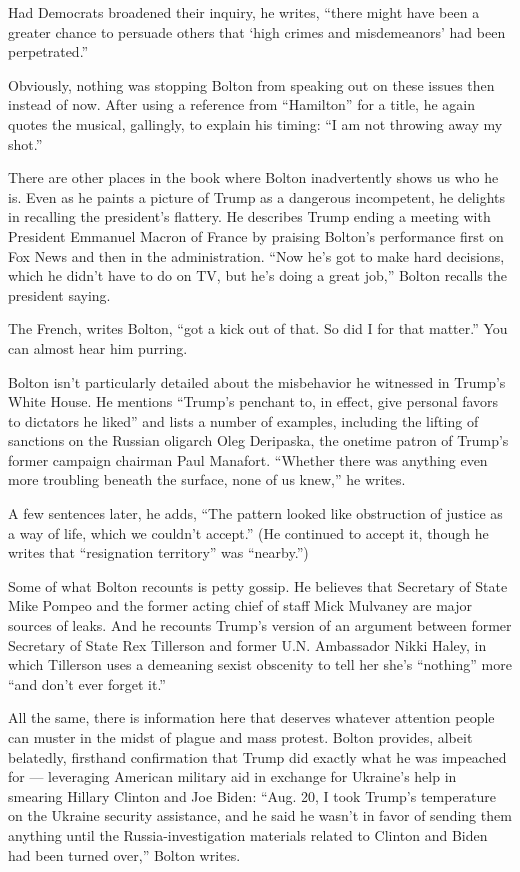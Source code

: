 Had Democrats broadened their inquiry, he writes, ``there might have
been a greater chance to persuade others that `high crimes and
misdemeanors' had been perpetrated.''

Obviously, nothing was stopping Bolton from speaking out on these issues
then instead of now. After using a reference from ``Hamilton'' for a
title, he again quotes the musical, gallingly, to explain his timing:
``I am not throwing away my shot.''

There are other places in the book where Bolton inadvertently shows us
who he is. Even as he paints a picture of Trump as a dangerous
incompetent, he delights in recalling the president's flattery. He
describes Trump ending a meeting with President Emmanuel Macron of
France by praising Bolton's performance first on Fox News and then in
the administration. ``Now he's got to make hard decisions, which he
didn't have to do on TV, but he's doing a great job,'' Bolton recalls
the president saying.

The French, writes Bolton, ``got a kick out of that. So did I for that
matter.'' You can almost hear him purring.

Bolton isn't particularly detailed about the misbehavior he witnessed in
Trump's White House. He mentions ``Trump's penchant to, in effect, give
personal favors to dictators he liked'' and lists a number of examples,
including the lifting of sanctions on the Russian oligarch Oleg
Deripaska, the onetime patron of Trump's former campaign chairman Paul
Manafort. ``Whether there was anything even more troubling beneath the
surface, none of us knew,'' he writes.

A few sentences later, he adds, ``The pattern looked like obstruction of
justice as a way of life, which we couldn't accept.'' (He continued to
accept it, though he writes that ``resignation territory'' was
``nearby.'')

Some of what Bolton recounts is petty gossip. He believes that Secretary
of State Mike Pompeo and the former acting chief of staff Mick Mulvaney
are major sources of leaks. And he recounts Trump's version of an
argument between former Secretary of State Rex Tillerson and former U.N.
Ambassador Nikki Haley, in which Tillerson uses a demeaning sexist
obscenity to tell her she's ``nothing'' more ``and don't ever forget
it.''

All the same, there is information here that deserves whatever attention
people can muster in the midst of plague and mass protest. Bolton
provides, albeit belatedly, firsthand confirmation that Trump did
exactly what he was impeached for --- leveraging American military aid
in exchange for Ukraine's help in smearing Hillary Clinton and Joe
Biden: ``Aug. 20, I took Trump's temperature on the Ukraine security
assistance, and he said he wasn't in favor of sending them anything
until the Russia-investigation materials related to Clinton and Biden
had been turned over,'' Bolton writes.


